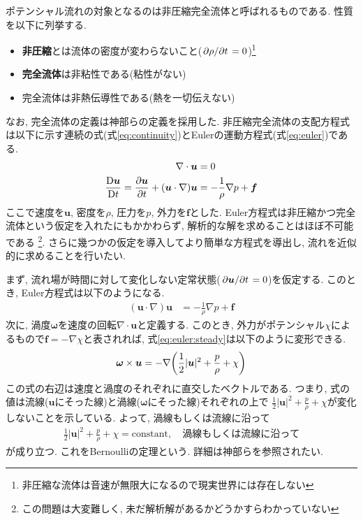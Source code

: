 \documentclass{ltjsarticle}
\begin{document}
ポテンシャル流れの対象となるのは非圧縮完全流体と呼ばれるものである. 
性質を以下に列挙する. 
\begin{itemize}
    \item \textbf{非圧縮}とは流体の密度が変わらないこと($\pdv*{\rho}{t}=0$)\footnote{非圧縮な流体は音速が無限大になるので現実世界には存在しない}
    \item \textbf{完全流体}は非粘性である(粘性がない)
    \item 完全流体は非熱伝導性である(熱を一切伝えない)
\end{itemize}
なお, 完全流体の定義は神部ら\cite{Kanbe1995}の定義を採用した. 
非圧縮完全流体の支配方程式は以下に示す連続の式(式\eqref{eq:continuity})とEulerの運動方程式(式\eqref{eq:euler})である. 
\begin{align}
    \nabla\cdot\bm{u} &= 0 \label{eq:continuity} \\
    \frac{\mathrm{D}\bm{u}}{\mathrm{D}t}=\pdv{\bm{u}}{t} +(\bm{u}\cdot\nabla)\bm{u} &= -\frac{1}{\rho}\nabla p + \bm{f} \label{eq:euler}
\end{align}
ここで速度を$\bm{u}$, 密度を$\rho$, 圧力を$p$, 外力を$\bm{f}$とした.
Euler方程式は非圧縮かつ完全流体という仮定を入れたにもかかわらず, 解析的な解を求めることはほぼ不可能である
\footnote{この問題は大変難しく, 未だ解析解があるかどうかすらわかっていない}.
さらに幾つかの仮定を導入してより簡単な方程式を導出し, 流れを近似的に求めることを行いたい.

まず, 流れ場が時間に対して変化しない定常状態($\pdv*{\bm{u}}{t}=0$)を仮定する.
このとき, Euler方程式は以下のようになる.
\begin{align}
    (\bm{u}\cdot\nabla)\bm{u} &= -\frac{1}{\rho}\nabla p + \bm{f} \label{eq:euler:steady}
\end{align}
次に, 渦度$\bm{\omega}$を速度の回転$\nabla\cdot\bm{u}$と定義する.
このとき, 外力がポテンシャル$\chi$によるもので$\bm{f}=-\nabla \chi$と表されれば,
式\eqref{eq:euler:steady}は以下のように変形できる.
\begin{align}
    \bm{\omega}\times\bm{u}=-\nabla\qty(\frac{1}{2}|\bm{u}|^2 + \frac{p}{\rho}+\chi)
    \label{eq:euler:steady:vorticity}
\end{align}
この式の右辺は速度と渦度のそれぞれに直交したベクトルである.
つまり, 式の値は流線($\bm{u}$にそった線)と渦線($\bm{\omega}$にそった線)それぞれの上で
$\frac{1}{2}|\bm{u}|^2 + \frac{p}{\rho}+\chi$が変化しないことを示している.
よって, 渦線もしくは流線に沿って
\begin{align}
    \frac{1}{2}|\bm{u}|^2 + \frac{p}{\rho}+\chi=\mathrm{constant}, \quad\mathrm{渦線もしくは流線に沿って}
    \label{eq:bernoulli}
\end{align}
が成り立つ. これをBernoulliの定理という.
詳細は神部ら\cite{Kanbe1995}を参照されたい. 
\end{document}
